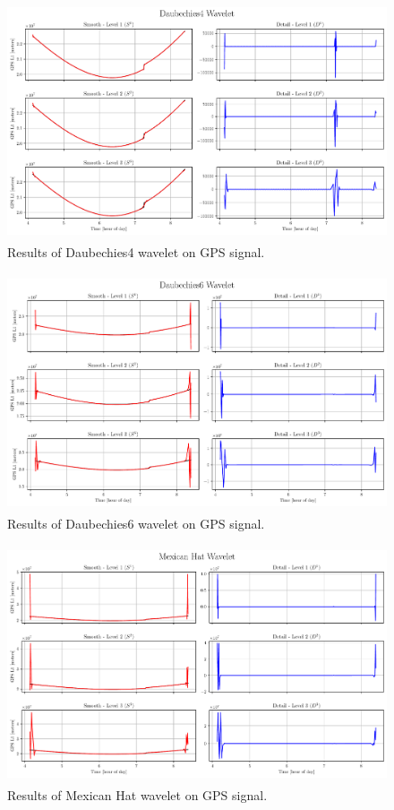 \documentclass[12pt]{article}
\begin{document}
	\begin{figure}[!h]
		\centering
		\includegraphics[height=7cm]{../Tests/Outputs/CycleSlip_Daubechies4.pdf}
		\caption{Results of Daubechies4 wavelet on GPS signal.}
		\label{fig:cs_db4}
	\end{figure}
	
	\begin{figure}[!h]
		\centering
		\includegraphics[height=7cm]{../Tests/Outputs/CycleSlip_Daubechies6.pdf}
		\caption{Results of Daubechies6 wavelet on GPS signal.}
		\label{fig:cs_db6}
	\end{figure}
	
	\begin{figure}[!h]
		\centering
		\includegraphics[height=7cm]{../Tests/Outputs/CycleSlip_MexicanHat.pdf}
		\caption{Results of Mexican Hat wavelet on GPS signal.}
		\label{fig:cs_mh}
	\end{figure}
	
\end{document}

